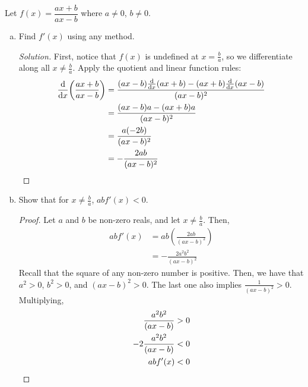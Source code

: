 \documentclass{agony}
\begin{document}
\question Let $f(x)=\dfrac{ax+b}{ax-b}$ where $a \neq 0$, $b \neq 0$.
\begin{enumerate}[(a)]
  \item Find $f'(x)$ using any method.
        \begin{proof}[Solution]
          First, notice that $f(x)$ is undefined at $x=\frac{b}{a}$,
          so we differentiate along all $x \neq \frac{b}{a}$.
          Apply the quotient and linear function rules:
          \begin{align*}
            \dv{x}(\frac{ax+b}{ax-b})
             & = \frac{(ax-b)\dv{x}(ax+b) - (ax+b)\dv{x}(ax-b)}{(ax-b)^2} \\
             & = \frac{(ax-b)a - (ax+b)a}{(ax-b)^2}                       \\
             & = \frac{a(-2b)}{(ax-b)^2}                                  \\
             & = -\frac{2ab}{(ax-b)^2} \qedhere
          \end{align*}
        \end{proof}
  \item Show that for $x \neq \frac{b}{a}$, $abf'(x)<0$.
        \begin{proof}
          Let $a$ and $b$ be non-zero reals, and let $x \neq \frac{b}{a}$. Then,
          \begin{align*}
            abf'(x) & = ab\left(\frac{2ab}{(ax-b)^2}\right) \\
                    & = -\frac{2a^2b^2}{(ax-b)^2}
          \end{align*}
          Recall that the square of any non-zero number is positive.
          Then, we have that $a^2 > 0$, $b^2 > 0$, and $(ax-b)^2 > 0$.
          The last one also implies $\frac{1}{(ax-b)^2} > 0$. Multiplying,
          \begin{align*}
            \frac{a^2b^2}{(ax-b)}   & > 0          \\
            -2\frac{a^2b^2}{(ax-b)} & < 0          \\
            abf'(x)                 & < 0 \qedhere
          \end{align*}
        \end{proof}
\end{enumerate}
\end{document}
